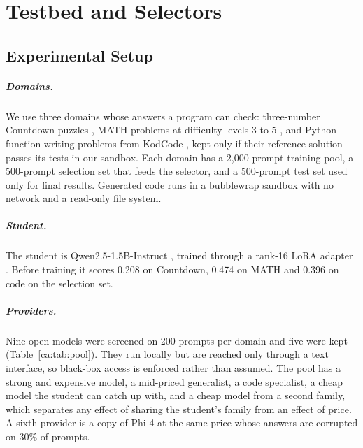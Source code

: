 \chapter{Testbed and Selectors}
\label{ca:chap:testbed}

\section{Experimental Setup}
\label{ca:sec:setup}

\paragraph{Domains.} We use three domains whose answers a program can check: three-number
Countdown puzzles \autocite{patino_gold_2025}, MATH problems at difficulty levels 3 to 5
\autocite{hendrycks_math_2021}, and Python function-writing problems from KodCode
\autocite{xu_kodcode_2025}, kept only if their reference solution passes its tests in our
sandbox. Each domain has a 2,000-prompt training pool, a 500-prompt selection set that
feeds the selector, and a 500-prompt test set used only for final results. Generated code
runs in a bubblewrap sandbox with no network and a read-only file system.

\paragraph{Student.} The student is Qwen2.5-1.5B-Instruct \autocite{qwen_qwen25_2024},
trained through a rank-16 LoRA adapter \autocite{hu_lora_2022}. Before training it scores
0.208 on Countdown, 0.474 on MATH and 0.396 on code on the selection set.

\paragraph{Providers.} Nine open models were screened on 200 prompts per domain and five
were kept (Table~\ref{ca:tab:pool}). They run locally but are reached only through a text
interface, so black-box access is enforced rather than assumed. The pool has a strong and
expensive model, a mid-priced generalist, a code specialist, a cheap model the student can
catch up with, and a cheap model from a second family, which separates any effect of
sharing the student's family from an effect of price. A sixth provider is a copy of Phi-4
at the same price whose answers are corrupted on 30\% of prompts.

